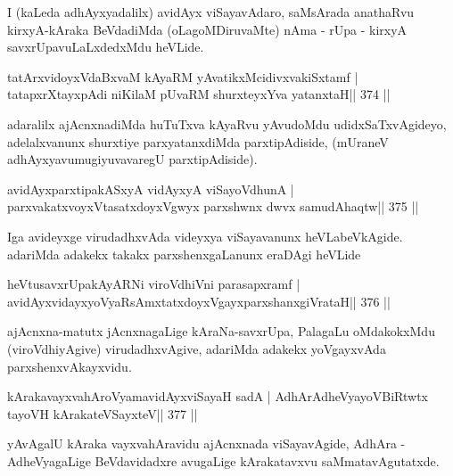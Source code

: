 \begin{artha}
I (kaLeda adhAyxyadalilx) avidAyx viSayavAdaro, saMsArada anathaRvu 
kirxyA-kAraka BeVdadiMda (oLagoMDiruvaMte) nAma - rUpa - kirxyA savxrUpavuLaLxdedxMdu heVLide. 
\end{artha}


\begin{shl}
tatArxvidoyxVdaBxvaM kAyaRM yAvatikxMcidivxvakiSxtamf |
tatapxrXtayxpAdi niKilaM pUvaRM shurxteyxYva yatanxtaH\hfill || 374 ||
\end{shl}

\begin{artha}
adaralilx ajAcnxnadiMda huTuTxva kAyaRvu yAvudoMdu udidxSaTxvAgideyo, 
adelalxvanunx shurxtiye parxyatanxdiMda parxtipAdiside, (mUraneV 
adhAyxyavu\break mugiyuvavaregU parxtipAdiside).
\end{artha}

\begin{shl}
avidAyxparxtipakASxyA vidAyxyA viSayoV\s dhunA |
parxvakatxvoyxV\s tasatxdoyxVgwyx parxshwnx dwvx samudAhaqtw\hfill || 375 ||
\end{shl}

\begin{artha}
Iga avideyxge virudadhxvAda videyxya viSayavanunx heVLabeVkAgide. adariMda adakekx takakx parxshenxgaLanunx eraDAgi heVLide
\end{artha}

\begin{shl}
heVtusavxrUpakAyARNi viroVdhiVni parasapxramf |
avidAyxvidayxyoVyaRsAmxtatxdoyxVgayxparxshanxgiVrataH\hfill || 376 ||
\end{shl}

\begin{artha}
ajAcnxna-matutx jAcnxnagaLige kAraNa-savxrUpa, PalagaLu oMdakokxMdu  (viroVdhiyAgive) virudadhxvAgive, adariMda adakekx yoVgayxvAda parxshenxvAkayxvidu.
\end{artha}

\begin{shl}
kArakavayxvahAroV\s yamavidAyxviSayaH sadA |
AdhArAdheVyayoVBiRtwtx tayoVH kArakateVSayxteV\hfill || 377 ||
\end{shl}

\begin{artha}
yAvAgalU kAraka vayxvahAravidu ajAcnxnada viSayavAgide, AdhAra -  AdheVyagaLige BeVdavidadxre avugaLige kArakatavxvu saMmatavAgutatxde.
\end{artha}


